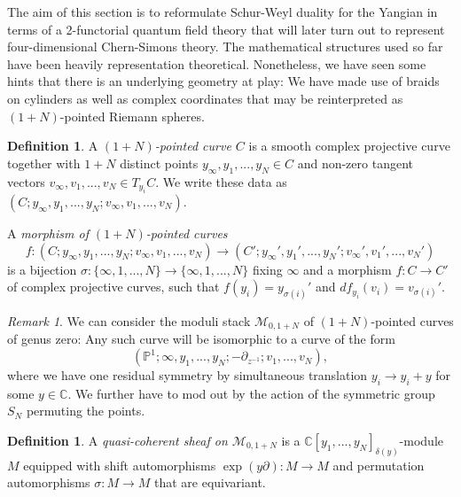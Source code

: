 \documentclass[11pt]{report}
\theoremstyle{definition}
\newtheorem{definition}[theorem]{Definition}
\theoremstyle{remark}
\newtheorem*{remark}{Remark}
\theoremstyle{remark}
\newcommand{\C}{\mathbb{C}}
\renewcommand{\P}{\mathbb{P}}
\begin{document}
The aim of this section is to reformulate Schur-Weyl duality for the Yangian in terms of a 2-functorial quantum field theory that will later turn out to represent four-dimensional Chern-Simons theory. The mathematical structures used so far have been heavily representation theoretical. Nonetheless, we have seen some hints that there is an underlying geometry at play: We have made use of braids on cylinders as well as complex coordinates that may be reinterpreted as $(1+N)$-pointed Riemann spheres. 

\begin{definition}
\item A \emph{$(1+N)$-pointed curve $C$} is a smooth complex projective curve together with $1+N$ distinct points $y_\infty,y_1,...,y_N \in C$ and non-zero tangent vectors $v_\infty,v_1,...,v_N \in T_{y_i} C$. We write these data as $(C;y_\infty,y_1,...,y_N;v_\infty,v_1,...,v_N)$.
\item A \emph{morphism of $(1+N)$-pointed curves}
\begin{equation*}
f: (C;y_\infty,y_1,...,y_N;v_\infty,v_1,...,v_N) \to (C';y_\infty',y_1',...,y_N';v_\infty',v_1',...,v_N')
\end{equation*}
is a bijection $\sigma: \{ \infty,1,...,N \} \to \{ \infty,1,...,N \}$ fixing $\infty$ and a morphism $f: C \to C'$ of complex projective curves, such that $f(y_i) = y_{\sigma(i)}'$ and $df_{y_i}(v_i) = v_{\sigma(i)}'$. 
\end{definition}

\begin{remark}
We can consider the moduli stack $\mathcal{M}_{0,1+N}$ of $(1+N)$-pointed curves of genus zero: Any such curve will be isomorphic to a curve of the form
\begin{equation*}
(\P^1;\infty,y_1,...,y_N;-\partial_{z^{-1}};v_1,...,v_N),
\end{equation*}
where we have one residual symmetry by simultaneous translation $y_i \to y_i + y$ for some $y \in \C$. We further have to mod out by the action of the symmetric group $S_N$ permuting the points.
\end{remark}

\begin{definition}
A \emph{quasi-coherent sheaf on $\mathcal{M}_{0,1+N}$} is a $\C[y_1,...,y_N]_{\delta(y)}$-module $M$ equipped with shift automorphisms $\exp(y\partial): M \to M$ and permutation automorphisms $\sigma: M \to M$ that are equivariant.
\end{definition}
\end{document}
